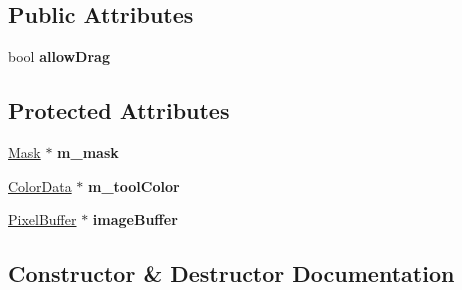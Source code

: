\subsection*{Public Attributes}
\begin{DoxyCompactItemize}
\item 
bool {\bfseries allow\+Drag}\hypertarget{classDrawTool_a87f991a7c84a4c5ad60ebbfd813a3ab2}{}\label{classDrawTool_a87f991a7c84a4c5ad60ebbfd813a3ab2}

\end{DoxyCompactItemize}
\subsection*{Protected Attributes}
\begin{DoxyCompactItemize}
\item 
\hyperlink{classMask}{Mask} $\ast$ {\bfseries m\+\_\+mask}\hypertarget{classDrawTool_a0a3cc5165047f1158bff38750ddf8e85}{}\label{classDrawTool_a0a3cc5165047f1158bff38750ddf8e85}

\item 
\hyperlink{classColorData}{Color\+Data} $\ast$ {\bfseries m\+\_\+tool\+Color}\hypertarget{classDrawTool_a3bb9153560d2b084c56d5e7d749d49a2}{}\label{classDrawTool_a3bb9153560d2b084c56d5e7d749d49a2}

\item 
\hyperlink{classPixelBuffer}{Pixel\+Buffer} $\ast$ {\bfseries image\+Buffer}\hypertarget{classDrawTool_a917dfe1261ea0d5c4250f8b83eddb177}{}\label{classDrawTool_a917dfe1261ea0d5c4250f8b83eddb177}

\end{DoxyCompactItemize}


\subsection{Constructor \& Destructor Documentation}
